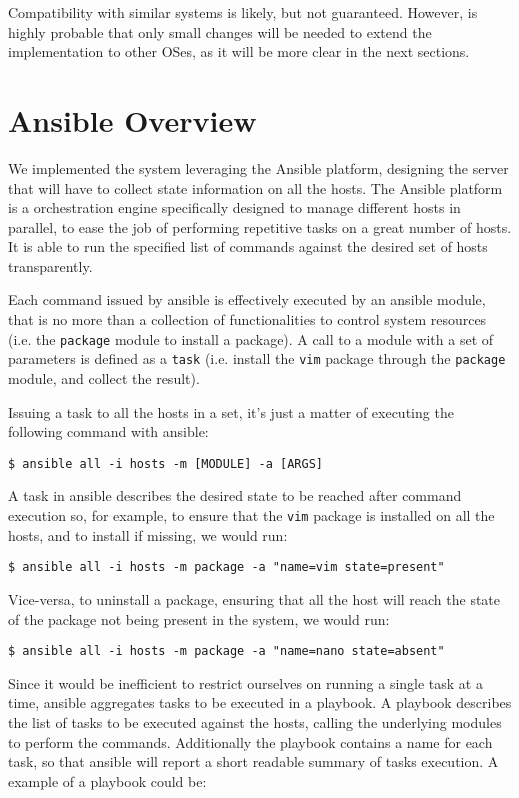 \documentclass[11pt]{article}
\begin{document}
Compatibility with similar systems is likely, but not guaranteed. However, is highly probable that only small changes will be needed to extend the implementation to other OSes, as it will be more clear in the next sections. 

\section{Ansible Overview} 

We implemented the system leveraging the Ansible platform, designing the server that will have to collect state information on all the hosts.
The Ansible platform is a orchestration engine specifically designed to manage different hosts in parallel, to ease the job of performing repetitive tasks on a great number of hosts. It is able to run the specified list of commands against the desired set of hosts transparently. 

Each command issued by ansible is effectively executed by an ansible module, that is no more than a collection of functionalities to control system resources (i.e. the {\tt package} module to install a package). A call to a module with a set of parameters is defined as a {\tt task} (i.e. install the {\tt vim} package through the {\tt package} module, and collect the result). 

Issuing a task to all the hosts in a set, it's just a matter of executing the following command with ansible:

\begin{verbatim}
$ ansible all -i hosts -m [MODULE] -a [ARGS]
\end{verbatim}

A task in ansible describes the desired state to be reached after command execution so, for example, to ensure that the {\tt vim} package is installed on all the hosts, and to install if missing, we would run:

\begin{verbatim}
$ ansible all -i hosts -m package -a "name=vim state=present"
\end{verbatim}

Vice-versa, to uninstall a package, ensuring that all the host will reach the state of the package not being present in the system, we would run:

\begin{verbatim}
$ ansible all -i hosts -m package -a "name=nano state=absent"
\end{verbatim}

Since it would be inefficient to restrict ourselves on running a single task at a time, ansible aggregates tasks to be executed in a playbook. A playbook describes the list of tasks to be executed against the hosts, calling the underlying modules to perform the commands. Additionally the playbook contains a name for each task, so that ansible will report a short readable summary of tasks execution. 
A example of a playbook could be:
\end{document}
